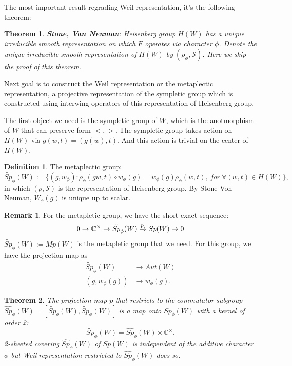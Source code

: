 \documentclass[12pt,a4paper,english]{article}
\theoremstyle{plain}
\newtheorem{thm}{Theorem}[section]
\theoremstyle{definition}
\newtheorem{defi}{Definition}
\newtheorem*{rem}{Remark}
\begin{document}
The most important result regrading Weil representation, it's the following theorem:
\begin{thm}
\textbf{Stone, Van Neuman}: Heisenberg group $H(W)$ has a unique irreducible smooth representation on which $F$ operates via character $\phi$. Denote the unique irreducible smooth representation of $H(W)$ by $(\rho_{\phi}, \mathcal{S})$. Here we skip the proof of this theorem.
\end{thm}

Next goal is to construct the Weil representation or the metaplectic representation, a projective representation of the sympletic group which is constructed using interwing operators of this representation of Heisenberg group. 

The first object we need is the sympletic group of $W$, which is the auotmorphism of $W$ that can preserve form $<,>$. The sympletic group takes action on $H(W)$ via $g(w,t)=(g(w),t)$. And this action is trivial on the center of $H(W)$.

\begin{defi}
The metaplectic group:
\begin{equation*}
    \tilde{Sp}_{\phi}(W):=\{(g,w_{\phi}):\rho_{\phi}(gw,t)\circ w_{\phi}(g)=w_{\phi}(g)\rho_{\phi}(w,t),\ for\ \forall (w,t )\in H(W)\},
\end{equation*}
in which $(\rho, \mathcal{S})$  is the representation of Heisenberg group. By Stone-Von Neuman, $W_{\phi}(g)$ is unique up to scalar.
\end{defi}
\begin{rem}
For the metapletic group, we have the short exact sequence:
\begin{equation*}
  0\rightarrow \mathbb{C}^{\times} \rightarrow \Tilde{Sp}_{\phi}(W)\xrightarrow{p}Sp(W)\rightarrow 0  
\end{equation*}
$\tilde{Sp}_{\phi}(W):=Mp(W)$ is the metapletic group that we need. For this group, we have the projection map as 
\begin{align*}
      \tilde{Sp}_{\phi}(W)&\rightarrow Aut(W)\\
      (g, w_{\phi}(g))&\rightarrow w_{\phi}(g).
\end{align*}
\end{rem}
\begin{thm}
The projection map $p$ that restricts to the commutator subgroup $\hat{Sp}_{\phi}(W)=[\tilde{Sp}_{\phi}(W),\tilde{Sp}_{\phi}(W)]$ is a map onto $Sp_{\phi}(W)$ with a kernel of order 2:
\begin{equation*}
    \tilde{Sp}_{\phi}(W)=\hat{Sp}_{\phi}(W)\times \mathbb{C}^{\times}. 
\end{equation*}
2-sheeted covering $\hat{ Sp}_{\phi}(W)$ of $Sp(W)$ is independent of the additive character $\phi$ but Weil representation restricted to $\hat{Sp}_{\phi}(W)$ does so. 
\end{thm}
\end{document}
